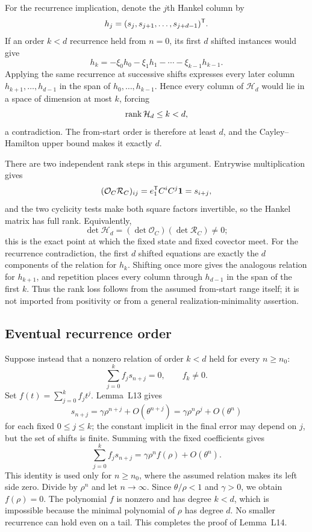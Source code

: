 \documentclass[11pt,letterpaper]{article}
\theoremstyle{plain}
\begin{document}
For the recurrence implication, denote the $j$th Hankel column by
\[
h_j=(s_j,s_{j+1},\ldots,s_{j+d-1})^{\mathsf{T}}.
\]
If an order $k<d$ recurrence held from $n=0$, its first $d$ shifted instances would give
\[
h_k=-\xi_0h_0-\xi_1h_1-\cdots-\xi_{k-1}h_{k-1}.
\]
Applying the same recurrence at successive shifts expresses every later column $h_{k+1},\ldots,h_{d-1}$ in the span of $h_0,\ldots,h_{k-1}$.  Hence every column of $\mathcal H_d$ would lie in a space of dimension at most $k$, forcing
\[
\operatorname{rank}\mathcal H_d\leq k<d,
\]
a contradiction.  The from-start order is therefore at least $d$, and the Cayley--Hamilton upper bound makes it exactly $d$.

There are two independent rank steps in this argument.  Entrywise multiplication gives
\[
(\mathcal O_C\mathcal R_C)_{ij}
=e_1^{\mathsf{T}}C^iC^j\mathbf{1}=s_{i+j},
\]
and the two cyclicity tests make both square factors invertible, so the Hankel matrix has full rank.  Equivalently,
\[
\det\mathcal H_d=(\det\mathcal O_C)(\det\mathcal R_C)\ne0;
\]
this is the exact point at which the fixed state and fixed covector meet.  For the recurrence contradiction, the first \(d\) shifted equations are exactly the \(d\) components of the relation for \(h_k\).  Shifting once more gives the analogous relation for \(h_{k+1}\), and repetition places every column through \(h_{d-1}\) in the span of the first \(k\).  Thus the rank loss follows from the assumed from-start range itself; it is not imported from positivity or from a general realization-minimality assertion.

\subsection{Eventual recurrence order}

Suppose instead that a nonzero relation of order $k<d$ held for every $n\geq n_0$:
\[
\sum_{j=0}^k f_j s_{n+j}=0,\qquad f_k\ne0.
\]
Set $f(t)=\sum_{j=0}^k f_jt^j$.  Lemma~L13 gives
\[
s_{n+j}
=\gamma\rho^{n+j}+O(\theta^{n+j})
=\gamma\rho^n\rho^j+O(\theta^n)
\]
for each fixed $0\leq j\leq k$; the constant implicit in the final error may depend on $j$, but the set of shifts is finite.  Summing with the fixed coefficients gives
\[
\sum_{j=0}^k f_js_{n+j}
=\gamma\rho^nf(\rho)+O(\theta^n).
\]
This identity is used only for $n\geq n_0$, where the assumed relation makes its left side zero.  Divide by $\rho^n$ and let $n\to\infty$.  Since $\theta/\rho<1$ and $\gamma>0$, we obtain $f(\rho)=0$.  The polynomial $f$ is nonzero and has degree $k<d$, which is impossible because the minimal polynomial of $\rho$ has degree $d$.  No smaller recurrence can hold even on a tail.  This completes the proof of Lemma~L14.
\end{document}
